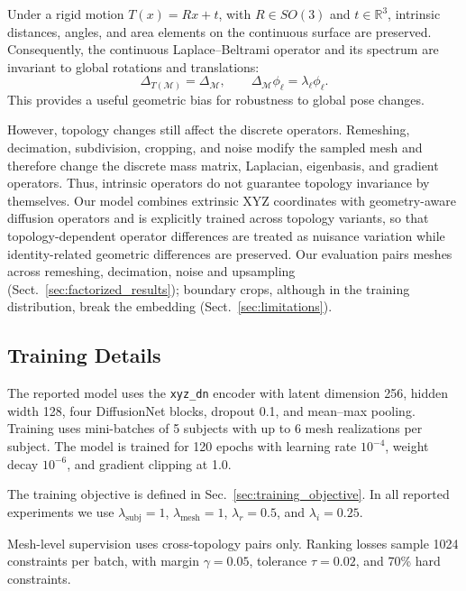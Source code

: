 \documentclass[10pt,twocolumn,letterpaper]{article}
\begin{document}
Under a rigid motion $T(x)=Rx+t$, with $R\in SO(3)$ and $t\in\mathbb{R}^3$, intrinsic distances, angles, and area elements on the continuous surface are preserved. Consequently, the continuous Laplace--Beltrami operator and its spectrum are invariant to global rotations and translations:
\begin{equation}
\Delta_{T(\mathcal{M})}=\Delta_{\mathcal{M}},
\qquad
\Delta_{\mathcal{M}}\phi_\ell=\lambda_\ell\phi_\ell.
\end{equation}
This provides a useful geometric bias for robustness to global pose changes.

However, topology changes still affect the discrete operators. Remeshing,
decimation, subdivision, cropping, and noise modify the sampled mesh and
therefore change the discrete mass matrix, Laplacian, eigenbasis, and gradient
operators. Thus, intrinsic operators do not guarantee topology invariance by
themselves. Our model combines extrinsic XYZ coordinates with geometry-aware
diffusion operators and is explicitly trained across topology variants, so that
topology-dependent operator differences are treated as nuisance variation while
identity-related geometric differences are preserved. Our evaluation pairs meshes
across remeshing, decimation, noise and upsampling (Sect.~\ref{sec:factorized_results});
boundary crops, although in the training distribution, break the embedding
(Sect.~\ref{sec:limitations}).

\subsection{Training Details}
\label{app:training_details}

The reported model uses the \texttt{xyz\_dn} encoder with latent dimension 256,
hidden width 128, four DiffusionNet blocks, dropout 0.1, and mean--max pooling.
Training uses mini-batches of 5 subjects with up to 6 mesh realizations per
subject. The model is trained for 120 epochs with learning rate $10^{-4}$,
weight decay $10^{-6}$, and gradient clipping at 1.0.

The training objective is defined in Sec.~\ref{sec:training_objective}. In all
reported experiments we use $\lambda_{\mathrm{subj}}=1$,
$\lambda_{\mathrm{mesh}}=1$, $\lambda_r=0.5$, and $\lambda_i=0.25$.

Mesh-level supervision uses cross-topology pairs only. Ranking losses sample
1024 constraints per batch, with margin $\gamma=0.05$, tolerance $\tau=0.02$,
and 70\% hard constraints.
\end{document}
